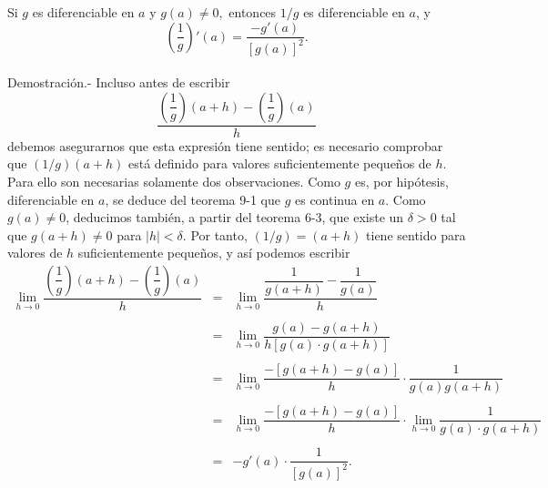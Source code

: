 \begin{teo}
    Si $g$ es diferenciable en $a$ y $g(a)\neq 0,$ entonces $1/g$ es diferenciable en $a$, y 
    $$\left(\dfrac{1}{g}\right)'(a)=\dfrac{-g'(a)}{\left[g(a)\right]^2}.$$\\
	Demostración.-\; Incluso antes de escribir
	$$\dfrac{\left(\dfrac{1}{g}\right)(a+h)-\left(\dfrac{1}{g}\right)(a)}{h}$$
	debemos asegurarnos que esta expresión tiene sentido; es necesario comprobar que $(1/g)(a+h)$ está definido para valores suficientemente pequeños de $h$. Para ello son necesarias solamente dos observaciones. Como $g$ es, por hipótesis, diferenciable en $a$, se deduce del teorema 9-1 que $g$ es continua en $a$. Como $g(a)\neq 0$, deducimos también, a partir del teorema 6-3, que existe un $\delta>0$ tal que $g(a+h)\neq 0$ para $|h|<\delta$. Por tanto, $(1/g)=(a+h)$ tiene sentido para valores de $h$ suficientemente pequeños, y así podemos escribir
	$$\begin{array}{rcl}
	    \lim\limits_{h\to 0} \dfrac{\left(\dfrac{1}{g}\right)(a+h)-\left(\dfrac{1}{g}\right)(a)}{h}&=& \lim\limits_{h\to 0} \dfrac{\dfrac{1}{g(a+h)}-\dfrac{1}{g(a)}}{h}\\\\			
				 &=& \lim\limits_{h\to 0} \dfrac{g(a)-g(a+h)}{h\left[g(a)\cdot g(a+h)\right]}\\\\
				 &=& \lim\limits_{h\to 0} \dfrac{-\left[g(a+h)-g(a)\right]}{h}\cdot \dfrac{1}{g(a)g(a+h)}\\\\
				 &=& \lim\limits_{h\to 0} \dfrac{-\left[g(a+h)-g(a)\right]}{h}\cdot \lim\limits_{h\to 0}\dfrac{1}{g(a)\cdot g(a+h)}\\\\
				 &=&-g'(a)\cdot \dfrac{1}{\left[g(a)\right]^2}.\\\\
	\end{array}$$

\end{teo}

